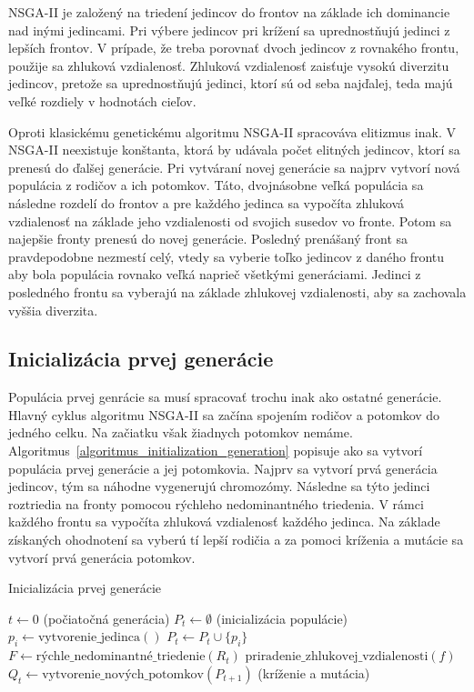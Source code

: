 NSGA-II je založený na triedení jedincov do frontov na základe ich dominancie nad inými jedincami.
Pri výbere jedincov pri krížení sa uprednostňujú jedinci z lepších frontov.
V prípade, že treba porovnať dvoch jedincov z rovnakého frontu, použije sa zhluková vzdialenosť.
Zhluková vzdialenosť zaisťuje vysokú diverzitu jedincov, pretože sa uprednostňujú jedinci, ktorí sú od seba najďalej, teda majú veľké rozdiely v hodnotách cieľov.

Oproti klasickému genetickému algoritmu NSGA-II spracováva elitizmus inak.
V NSGA-II neexistuje konštanta, ktorá by udávala počet elitných jedincov, ktorí sa prenesú do ďalšej generácie.
Pri vytváraní novej generácie sa najprv vytvorí nová populácia z rodičov a ich potomkov.
Táto, dvojnásobne veľká populácia sa následne rozdelí do frontov a pre každého jedinca sa vypočíta zhluková vzdialenosť na základe jeho vzdialenosti od svojich susedov vo fronte.
Potom sa najepšie fronty prenesú do novej generácie.
Posledný prenášaný front sa pravdepodobne nezmestí celý, vtedy sa vyberie toľko jedincov z daného frontu aby bola populácia rovnako veľká naprieč všetkými generáciami.
Jedinci z posledného frontu sa vyberajú na základe zhlukovej vzdialenosti, aby sa zachovala vyššia diverzita.

\subsection*{Inicializácia prvej generácie}
Populácia prvej genrácie sa musí spracovať trochu inak ako ostatné generácie.
Hlavný cyklus algoritmu NSGA-II sa začína spojením rodičov a potomkov do jedného celku.
Na začiatku však žiadnych potomkov nemáme.
Algoritmus~\ref{algoritmus_initialization_generation} popisuje ako sa vytvorí populácia prvej generácie a jej potomkovia.
Najprv sa vytvorí prvá generácia jedincov, tým sa náhodne vygenerujú chromozómy.
Následne sa týto jedinci roztriedia na fronty pomocou rýchleho nedominantného triedenia.
V rámci každého frontu sa vypočíta zhluková vzdialenosť každého jedinca.
Na základe získaných ohodnotení sa vyberú tí lepší rodičia a za pomoci kríženia a mutácie sa vytvorí prvá generácia potomkov.

\vspace*{\dimexpr0.5\baselineskip\relax}
\begin{algorithm}[h]\label{algoritmus_initialization_generation}
\caption{Inicializácia prvej generácie}
  $t \gets 0$ (počiatočná generácia)\;
  $P_t \gets \emptyset$ (inicializácia populácie)\;
   {
    $p_i \gets \text{vytvorenie\_jedinca}()$\;
    $P_t \gets P_t \cup \{p_i\}$\;
  }
  $F \gets \text{rýchle\_nedominantné\_triedenie}(R_t)$\;
   {
    $\text{priradenie\_zhlukovej\_vzdialenosti}(f)$\;
  }
  $Q_t \gets \text{vytvorenie\_nových\_potomkov}(P_{t+1})$ (kríženie a mutácia)\;
\end{algorithm}

